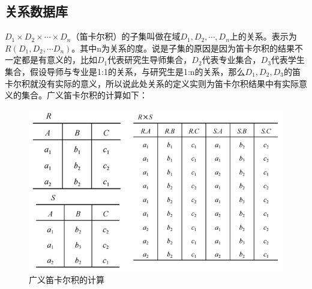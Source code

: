 \documentclass[main.tex]{subfiles}
\begin{document}
\subsection{关系数据库}
$ D_1 \times D_2 \times \cdots \times D_n $（笛卡尔积）的子集叫做在域$ D_1, D_2, \cdots, D_n $上的关系。表示为$ R(D_1, D_2,\cdots D_n) $。其中n为关系的度。说是子集的原因是因为笛卡尔积的结果不一定都是有意义的，比如$ D_1 $代表研究生导师集合，$ D_2  $代表专业集合，$ D_3 $代表学生集合，假设导师与专业是1:1的关系，与研究生是1:n的关系，那么$ D_1, D_2, D_3 $的笛卡尔积就没有实际的意义，所以说此处关系的定义实则为笛卡尔积结果中有实际意义的集合。广义笛卡尔积的计算如下：\\
\begin{figure}[H]
    \centering
    \includegraphics[scale=0.25]{./images/0025.png}
    \caption{广义笛卡尔积的计算}
\end{figure}
\end{document}
